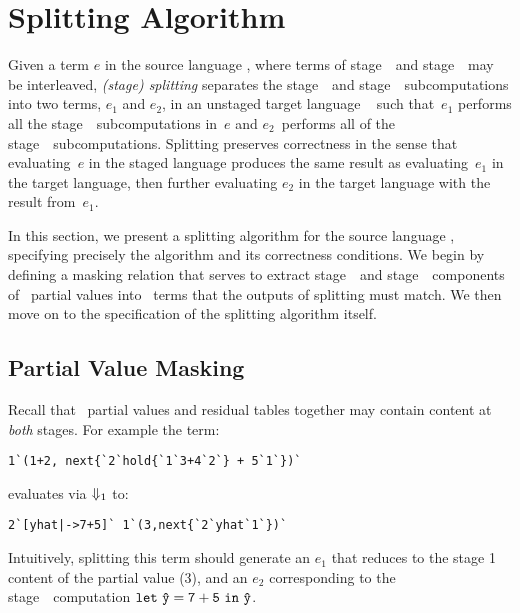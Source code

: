 \section{Splitting Algorithm}
\label{sec:splitting}

Given a term $e$ in the source language \lang, where terms of
stage~\bbone\ and stage~\bbtwo\ may be interleaved, \emph{(stage)
  splitting} separates the stage~\bbone\ and stage~\bbtwo\
subcomputations into two terms, $e_1$ and $e_2$, in an unstaged target language \langmono\ 
such that~$e_1$ performs all the
stage~\bbone\ subcomputations in~$e$ and $e_2$~performs all of the
stage~\bbtwo\ subcomputations. Splitting preserves correctness in the sense that evaluating~$e$ in
the staged language produces the same result as evaluating~$e_1$ in the target language, then further evaluating 
$e_2$ in the target language with the result from~$e_1$.

In this section, we present a
splitting algorithm for the source language \lang, specifying
precisely the algorithm and its correctness conditions.  
We begin by defining a masking relation that serves to extract stage~\bbone\ and
stage~\bbtwo\ components of \lang\ partial values into \langmono\ terms that the outputs of splitting must match. We then 
move on to the specification of the splitting algorithm itself.


\subsection{Partial Value Masking}


Recall that \lang\ partial values and residual tables together may
contain content at \emph{both} stages. For example the term:
\begin{lstlisting}
1`(1+2, next{`2`hold{`1`3+4`2`} + 5`1`})`
\end{lstlisting}
evaluates via ${\Downarrow_{ 1}}$ to:
\begin{lstlisting}
2`[yhat|->7+5]` 1`(3,next{`2`yhat`1`})`
\end{lstlisting}
Intuitively, splitting this term should generate an $e_1$ that reduces to the stage 1 content of the partial value (3), and an $e_2$ corresponding to the stage~\bbtwo\
computation ${\tt let}~{\mathtt{\hat y}} = {\mathtt{7+5}}~{\tt in}~{\mathtt{\hat y}}$.

